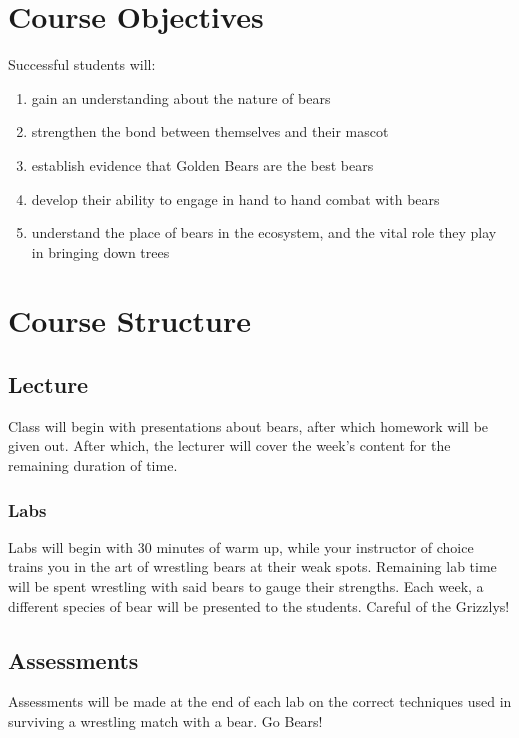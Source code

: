 \documentclass[11pt]{article}
\begin{document}
\section*{Course Objectives}
Successful students will:
\begin{enumerate}
\item gain an understanding about the nature of bears 
\item strengthen the bond between themselves and their mascot
\item establish evidence that Golden Bears are the best bears
\item develop their ability to engage in hand to hand combat with bears
\item understand the place of bears in the ecosystem, and the vital role they play in bringing down trees 
\end{enumerate}


\section*{Course Structure}

\subsection*{Lecture}

Class will begin with presentations about bears, after which homework will be given out. After which, the lecturer will cover the week's content for the remaining duration of time. 

\subsubsection*{Labs}

Labs will begin with 30 minutes of warm up, while your instructor of choice trains you in the art of wrestling bears at their weak spots. Remaining lab time will be spent wrestling with said bears to gauge their strengths. Each week, a different species of bear will be presented to the students. Careful of the Grizzlys! 

\subsection*{Assessments}

Assessments will be made at the end of each lab on the correct techniques used in surviving a wrestling match with a bear. Go Bears!
\end{document}
